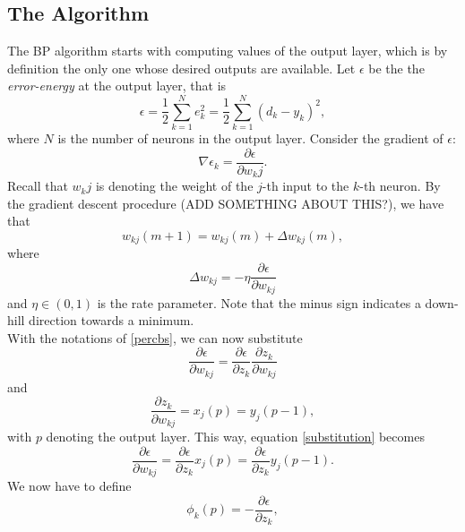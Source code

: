 \documentclass[%
    corpo=11pt,
    twoside,
    stile=classica,
    oldstyle,
    autoretitolo,
    tipotesi=magistrale,
    greek,
    evenboxes,
    english
]{toptesi}
\begin{document}
\subsection{The Algorithm}
The BP algorithm starts with computing values of the output layer, which is by definition the only one whose desired outputs are available. Let $\epsilon$ be the the \textit{error-energy} at the output layer, that is
\begin{equation}
\label{errorenergy}
\epsilon = \frac{1}{2}\sum_{k=1}^{N}e_k^2  =\frac{1}{2}\sum_{k=1}^{N}\left(d_k - y_k\right)^2,
\end{equation}
where $N$ is the number of neurons in the output layer. Consider the gradient of $\epsilon$:
\begin{equation}
\nabla \epsilon_k = \frac{\partial \epsilon}{\partial w_kj}.
\end{equation}
Recall that $w_kj$ is denoting the weight of the $j$-th input to the $k$-th neuron. By the gradient descent procedure (ADD SOMETHING ABOUT THIS?), we have that 
\begin{equation}
w_{kj}(m+1) = w_{kj}(m) + \Delta w_{kj}(m),
\end{equation}
where 
\begin{equation}
\label{deltasub}
\Delta w_{kj} = -\eta \frac{\partial \epsilon}{\partial w_{kj}}
\end{equation}
and $\eta \in \left(0,1 \right)$ is the rate parameter. Note that the minus sign indicates a down-hill direction towards a minimum. \\
With the notations of \ref{percbs}, we can now substitute 
\begin{equation}
\label{substitution}
\frac{\partial \epsilon}{\partial w_{kj}} = \frac{\partial \epsilon}{\partial z_k} \frac{\partial z_k}{\partial w_{kj}}
\end{equation}
and 
\begin{equation}
\label{graupe6p8}
\frac{\partial z_k}{\partial w_{kj}} = x_j(p) = y_j(p -1),
\end{equation}
with $p$ denoting the output layer. This way, equation \ref{substitution} becomes 
\begin{equation}
\label{newsubstitution}
\frac{\partial \epsilon}{\partial w_{kj}} = \frac{\partial \epsilon}{\partial z_k}x_j(p) = \frac{\partial \epsilon}{\partial z_k} y_j(p-1).
\end{equation}
We now have to define 
\begin{equation}
\label{phisub}
\phi_k(p) = - \frac{\partial \epsilon}{\partial z_k},
\end{equation}
\end{document}
